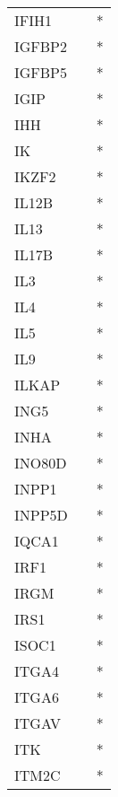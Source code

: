 \begin{longtable}{lcc}
IFIH1           &                &          * \\
IGFBP2          &                &          * \\
IGFBP5          &                &          * \\
IGIP            &                &          * \\
IHH             &                &          * \\
IK              &                &          * \\
IKZF2           &                &          * \\
IL12B           &                &          * \\
IL13            &                &          * \\
IL17B           &                &          * \\
IL3             &                &          * \\
IL4             &                &          * \\
IL5             &                &          * \\
IL9             &                &          * \\
ILKAP           &                &          * \\
ING5            &                &          * \\
INHA            &                &          * \\
INO80D          &                &          * \\
INPP1           &                &          * \\
INPP5D          &                &          * \\
IQCA1           &                &          * \\
IRF1            &                &          * \\
IRGM            &                &          * \\
IRS1            &                &          * \\
ISOC1           &                &          * \\
ITGA4           &                &          * \\
ITGA6           &                &          * \\
ITGAV           &                &          * \\
ITK             &                &          * \\
ITM2C           &                &          * \\

\end{longtable}
